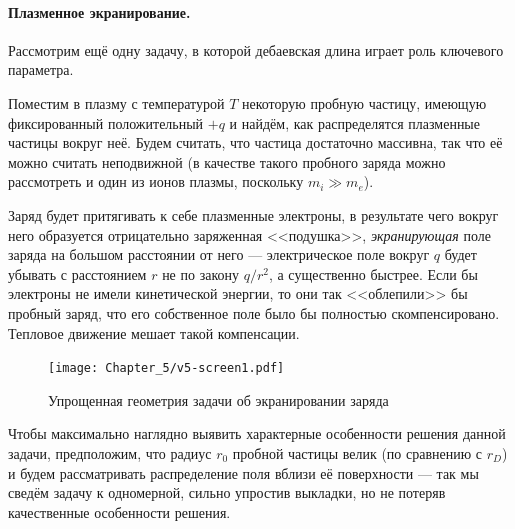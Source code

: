 \paragraph{Плазменное экранирование.}
Рассмотрим ещё одну задачу, в которой дебаевская длина играет роль
ключевого параметра.

Поместим в плазму с температурой $T$ некоторую пробную частицу, имеющую фиксированный
положительный $+q$ и найдём, как распределятся плазменные частицы вокруг неё.
Будем считать, что частица достаточно массивна, так что её можно
считать неподвижной (в качестве такого пробного заряда можно рассмотреть
и один из ионов плазмы, поскольку $m_i \gg m_e$).

Заряд будет притягивать к себе плазменные электроны, в результате чего
вокруг него образуется отрицательно заряженная <<подушка>>,
\emph{экранирующая} поле заряда на большом расстоянии от него ---
электрическое поле вокруг $q$ будет убывать с расстоянием $r$
не по закону $q/r^2$, а существенно быстрее.
Если бы электроны не имели кинетической энергии, то они так <<облепили>>
бы пробный заряд, что его собственное поле было бы полностью скомпенсировано.
Тепловое движение мешает такой компенсации.

\begin{figure}
\centering\texttt{[image: Chapter\_5/v5-screen1.pdf]}
\caption{Упрощенная геометрия задачи об экранировании заряда}
\end{figure}

Чтобы максимально наглядно выявить характерные особенности решения данной задачи,
предположим, что радиус $r_0$ пробной частицы велик (по сравнению с $r_D$)
и будем рассматривать распределение поля вблизи её поверхности ---
так мы сведём задачу к одномерной, сильно упростив выкладки, но не потеряв
качественные особенности решения.


